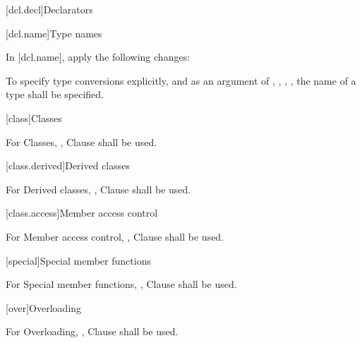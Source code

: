 
[dcl.decl]{Declarators}

[dcl.name]{Type names}

\pnum
In {\cppstddocno} [dcl.name], apply the following changes:

\begin{std.txt}
To specify type conversions explicitly, and as an argument of ,
, ,  ,  the name of a type shall be specified.
\end{std.txt}

[class]{Classes}

For Classes, {\cppstddocno}, Clause \the\value{chapter} shall be used.

[class.derived]{Derived classes}

For Derived classes, {\cppstddocno}, Clause \the\value{chapter} shall be used.

[class.access]{Member access control}

For Member access control, {\cppstddocno}, Clause \the\value{chapter} shall be used.

[special]{Special member functions}

For Special member functions, {\cppstddocno}, Clause \the\value{chapter} shall be used.

[over]{Overloading}

For Overloading, {\cppstddocno}, Clause \the\value{chapter} shall be used.

